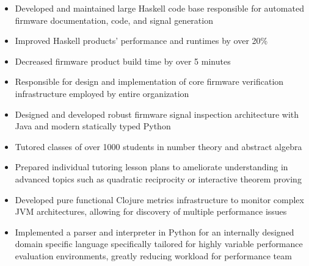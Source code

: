 \documentclass[10pt,a4paper]{altacv}
\newenvironment{tightitemize} %
{\vspace{-\topsep}\begin{itemize}\itemsep1pt \parskip0pt \parsep0pt}
{\end{itemize}\vspace{-\topsep}}
\begin{document}
\vspace{\topsep} %
\begin{tightitemize}
\item Developed and maintained large Haskell code base responsible for automated firmware 
    documentation, code, and signal generation
\item Improved Haskell products' performance and runtimes by over 20\%
\item Decreased firmware product build time by over 5 minutes
\item Responsible for design and implementation of core firmware
    verification infrastructure employed by entire organization
\item Designed and developed robust firmware signal inspection architecture with 
    Java and modern statically typed Python
\end{tightitemize}

\divider

\vspace{\topsep} %
\begin{tightitemize}
\item Tutored classes of over 1000 students in number theory and abstract algebra
\item Prepared individual tutoring lesson plans to ameliorate 
    understanding in advanced topics such as quadratic reciprocity or 
    interactive theorem proving
\end{tightitemize}

\divider

\vspace{\topsep} %
\begin{tightitemize}
    \item Developed pure functional Clojure metrics infrastructure to monitor 
        complex JVM architectures, allowing for discovery of multiple 
        performance issues
    \item Implemented a parser and interpreter in Python for an 
        internally designed domain specific language specifically tailored for 
        highly variable performance evaluation environments, greatly reducing 
        workload for performance team
\end{tightitemize}
\end{document}

